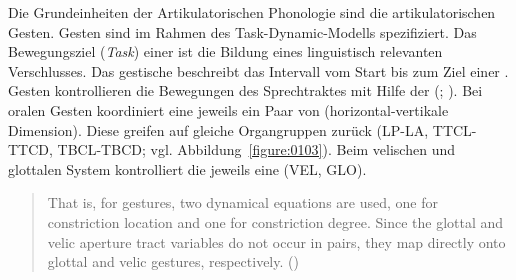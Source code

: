 Die Grundeinheiten der Artikulatorischen Phonologie sind die artikulatorischen Gesten. Gesten sind im Rahmen des Task-Dynamic-Modells spezifiziert. Das Bewegungsziel (\emph{Task}) einer  ist die Bildung eines linguistisch relevanten Verschlusses. Das gestische  beschreibt das Intervall vom Start bis zum Ziel einer . Gesten kontrollieren die Bewegungen des Sprechtraktes mit Hilfe der  (\citealt[vgl.][]{Browman1991a}; \citealt{Browman1992a}). Bei oralen Gesten koordiniert eine  jeweils ein Paar von  (horizontal-vertikale Dimension). Diese  greifen auf gleiche Organgruppen zurück (LP-LA, TTCL-TTCD, TBCL-TBCD; vgl. Abbildung~\ref{figure:0103}). Beim velischen und glottalen System kontrolliert die  jeweils eine  (VEL, GLO).

\begin{quotation}
	That is, for  gestures, two dynamical equations are used, one for constriction location and one for constriction degree. Since the glottal and velic aperture tract variables do not occur in pairs, they map directly onto glottal and velic gestures, respectively. (\citealt[][3]{Browman1991a})
\end{quotation}

